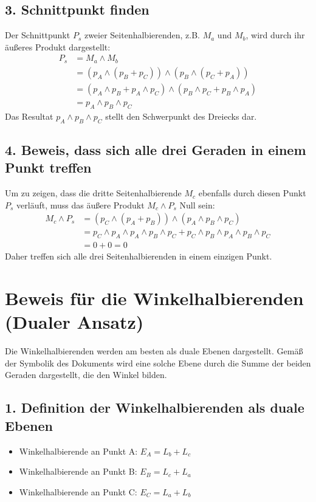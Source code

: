 \documentclass{article}
\begin{document}
\subsection*{3. Schnittpunkt finden}
Der Schnittpunkt $P_s$ zweier Seitenhalbierenden, z.B. $M_a$ und $M_b$, wird durch ihr äußeres Produkt dargestellt:
\begin{align*}
P_s &= M_a \wedge M_b \\
&= (p_A \wedge (p_B + p_C)) \wedge (p_B \wedge (p_C + p_A)) \\
&= (p_A \wedge p_B + p_A \wedge p_C) \wedge (p_B \wedge p_C + p_B \wedge p_A) \\
&= p_A \wedge p_B \wedge p_C
\end{align*}
Das Resultat $p_A \wedge p_B \wedge p_C$ stellt den Schwerpunkt des Dreiecks dar.

\subsection*{4. Beweis, dass sich alle drei Geraden in einem Punkt treffen}
Um zu zeigen, dass die dritte Seitenhalbierende $M_c$ ebenfalls durch diesen Punkt $P_s$ verläuft, muss das äußere Produkt $M_c \wedge P_s$ Null sein:
\begin{align*}
M_c \wedge P_s &= (p_C \wedge (p_A + p_B)) \wedge (p_A \wedge p_B \wedge p_C) \\
&= p_C \wedge p_A \wedge p_A \wedge p_B \wedge p_C + p_C \wedge p_B \wedge p_A \wedge p_B \wedge p_C \\
&= 0 + 0 = 0
\end{align*}
Daher treffen sich alle drei Seitenhalbierenden in einem einzigen Punkt.

\section{Beweis für die Winkelhalbierenden (Dualer Ansatz)}

Die Winkelhalbierenden werden am besten als duale Ebenen dargestellt. Gemäß der Symbolik des Dokuments wird eine solche Ebene durch die Summe der beiden Geraden dargestellt, die den Winkel bilden.

\subsection*{1. Definition der Winkelhalbierenden als duale Ebenen}
\begin{itemize}
    \item Winkelhalbierende an Punkt A: $E_A = L_b + L_c$
    \item Winkelhalbierende an Punkt B: $E_B = L_c + L_a$
    \item Winkelhalbierende an Punkt C: $E_C = L_a + L_b$
\end{itemize}
\end{document}
